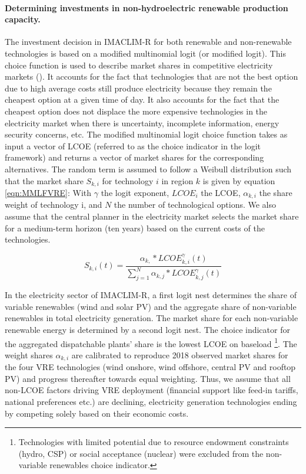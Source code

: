 \paragraph{Determining investments in non-hydroelectric renewable production capacity.}

The investment decision in IMACLIM-R for both renewable and non-renewable technologies is based on a modified multinomial logit (or modified logit). This choice function is used to describe market shares in competitive electricity markets (\cite{Clarke1993}). It accounts for the fact that technologies that are not the best option due to high average costs still produce electricity because they remain the cheapest option at a given time of day. It also accounts for the fact that the cheapest option does not displace the more expensive technologies in the electricity market when there is uncertainty, incomplete information, energy security concerns, etc.
The modified multinomial logit choice function takes as input a vector of LCOE (referred to as the choice indicator in the logit framework) and returns a vector of market shares for the corresponding alternatives. The random term is assumed to follow a Weibull distribution such that the market share $S_{k, i}$ for technology $i$ in region $k$ is given by equation \ref{eqn:MMLFVRE}:
With $\gamma$ the logit exponent, $LCOE_{i}$ the LCOE, $\alpha_{k,i}$ the share weight of technology i, and $N$ the number of technological options.
We also assume that the central planner in the electricity market selects the market share for a medium-term horizon (ten years) based on the current costs of the technologies.


\begin{dmath}
    S_{k,i}(t) = \frac{\alpha_{k,}*LCOE_{k,i}^{\gamma}(t)}{\sum_{j=1}^{N} \alpha_{k,j}*LCOE_{k,j}^{\gamma}(t)}
    \label{eqn:MMLFVRE}
\end{dmath}

In the electricity sector of IMACLIM-R, a first logit nest determines the share of variable renewables (wind and solar PV) and the aggregate share of non-variable renewables in total electricity generation. The market share for each non-variable renewable energy is determined by a second logit nest.
The choice indicator for the aggregated dispatchable plants’ share is the lowest LCOE on baseload
\footnote{Technologies with limited potential due to resource endowment constraints (hydro, CSP) or social acceptance (nuclear) were excluded from the non-variable renewables choice indicator.}. The weight shares $\alpha_{k,i}$ are calibrated to reproduce 2018 observed market shares for the four VRE technologies (wind onshore, wind offshore, central PV and rooftop PV) and progress thereafter towards equal weighting. Thus, we assume that all non-LCOE factors driving VRE deployment (financial support like feed-in tariffs, national preferences etc.) are declining, electricity generation technologies ending by competing solely based on their economic costs.

